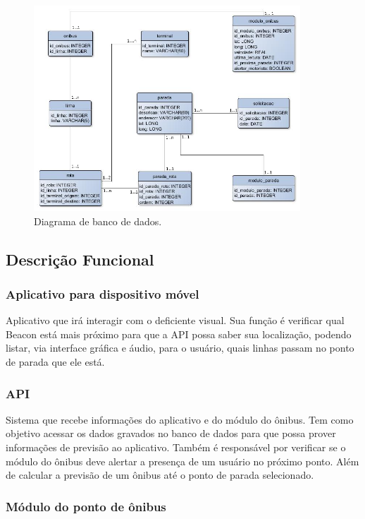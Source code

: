 \documentclass[
	12pt,				%
	oneside,			%
	a4paper,			%
	brazil				%
]{abntex2}
\begin{document}
\begin{figure}[!h]
\centering
\includegraphics[width=10cm, center]{images/database-api.png}
\caption{Diagrama de banco de dados.}
\label{Rotulo}
\end{figure}

\newpage

\subsection{Descrição Funcional}

\subsubsection{Aplicativo para dispositivo móvel}

Aplicativo que irá interagir com o deficiente visual. Sua função é verificar qual Beacon está mais próximo para que a API possa saber sua localização, podendo listar, via interface gráfica e áudio, para o usuário, quais linhas passam no ponto de parada que ele está.

\subsubsection{API}

Sistema que recebe informações do aplicativo e do módulo do ônibus. Tem como objetivo acessar os dados gravados no banco de dados para que possa prover informações de previsão ao aplicativo. Também é responsável por verificar se o módulo do ônibus deve alertar a presença de um usuário no próximo ponto. Além de calcular a previsão de um ônibus até o ponto de parada selecionado.

\subsubsection{Módulo do ponto de ônibus}
\end{document}
